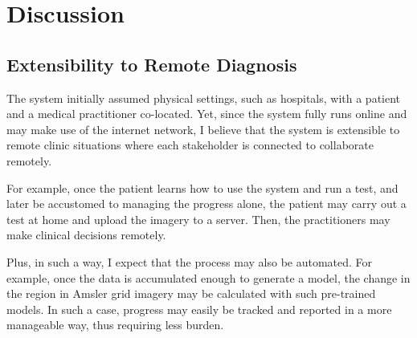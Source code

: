 \section{Discussion}

\begin{comment}
\subsection{Feedback from the Medical Practitioner}

Mus mauris vitae ultricies leo integer malesuada nunc. Eget nullam non nisi est sit amet. Tristique magna sit amet purus gravida quis. Interdum posuere lorem ipsum dolor sit amet. Vestibulum morbi blandit cursus risus at. Sapien pellentesque habitant morbi tristique senectus et. Etiam tempor orci eu lobortis. Orci sagittis eu volutpat odio facilisis mauris. Tempus egestas sed sed risus pretium quam. Mi sit amet mauris commodo. Nibh cras pulvinar mattis nunc sed. Nec dui nunc mattis enim ut tellus elementum sagittis vitae. Mi tempus imperdiet nulla malesuada pellentesque elit eget. Molestie at elementum eu facilisis sed odio. Ut aliquam purus sit amet luctus venenatis lectus magna fringilla. Id donec ultrices tincidunt arcu non sodales neque sodales.

\end{comment}

\subsection{Extensibility to Remote Diagnosis}

The system initially assumed physical settings, such as hospitals, with a patient and a medical practitioner co-located. Yet, since the system fully runs online and may make use of the internet network, I believe that the system is extensible to remote clinic situations where each stakeholder is connected to collaborate remotely.

For example, once the patient learns how to use the system and run a test, and later be accustomed to managing the progress alone, the patient may carry out a test at home and upload the imagery to a server. Then, the practitioners may make clinical decisions remotely.

Plus, in such a way, I expect that the process may also be automated. For example, once the data is accumulated enough to generate a model, the change in the region in Amsler grid imagery may be calculated with such pre-trained models. In such a case, progress may easily be tracked and reported in a more manageable way, thus requiring less burden.

